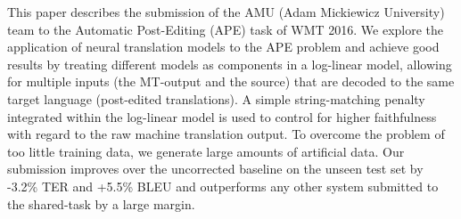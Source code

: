 This paper describes the submission of the AMU (Adam Mickiewicz University) team to the Automatic Post-Editing (APE) task of WMT 2016. We explore the application of neural translation models to the APE problem and achieve good results by treating different models as components in a log-linear model, allowing for multiple inputs (the MT-output and the source) that are decoded to the same target language (post-edited translations). A simple string-matching penalty integrated within the log-linear model is used to control for higher faithfulness with regard to the raw machine translation output. To overcome the problem of too little training data, we generate large amounts of artificial data. Our submission improves over the uncorrected baseline on the unseen test set by -3.2\% TER and +5.5\% BLEU and outperforms any other system submitted to the shared-task by a large margin.
